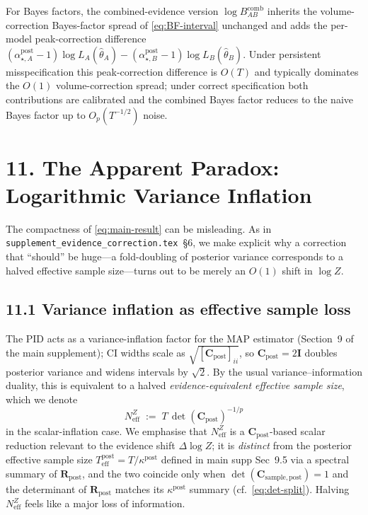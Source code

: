 \documentclass[11pt]{article}
\begin{document}
For Bayes factors, the combined-evidence version $\log B_{AB}^{\mathrm{comb}}$ inherits
the volume-correction Bayes-factor spread of \eqref{eq:BF-interval} unchanged and adds
the per-model peak-correction difference
$(\alpha_{\star,A}^{\mathrm{post}}-1)\log L_A(\hat\theta_A) -
 (\alpha_{\star,B}^{\mathrm{post}}-1)\log L_B(\hat\theta_B)$.
Under persistent misspecification this peak-correction difference is $O(T)$ and
typically dominates the $O(1)$ volume-correction spread; under
correct specification both contributions are calibrated and the combined Bayes
factor reduces to the naive Bayes factor up to $O_p(T^{-1/2})$ noise.

\section*{11. The Apparent Paradox: Logarithmic Variance Inflation}

The compactness of \eqref{eq:main-result} can be misleading. As in
\texttt{supplement\_evidence\_correction.tex}~\S6, we make explicit why a correction that
``should'' be huge---a fold-doubling of posterior variance corresponds to a halved effective
sample size---turns out to be merely an $O(1)$ shift in $\log Z$.

\subsection*{11.1 Variance inflation as effective sample loss}

The PID acts as a variance-inflation factor for the MAP estimator (Section~9 of the main
supplement); CI widths scale as $\sqrt{[\mathbf C_{\mathrm{post}}]_{ii}}$, so
$\mathbf C_{\mathrm{post}} = 2\mathbf I$ doubles posterior variance and widens intervals
by $\sqrt{2}$. By the usual variance--information duality, this is equivalent to a halved
\emph{evidence-equivalent effective sample size}, which we denote
\begin{equation}
N_{\mathrm{eff}}^{Z}
\;:=\;
T\,\det(\mathbf C_{\mathrm{post}})^{-1/p}
\label{eq:Neff-from-Cpost}
\end{equation}
in the scalar-inflation case. We emphasise that $N_{\mathrm{eff}}^{Z}$ is a
$\mathbf C_{\mathrm{post}}$-based scalar reduction relevant to the evidence shift
$\Delta\log Z$; it is \emph{distinct} from the posterior effective sample size
$T_{\mathrm{eff}}^{\mathrm{post}} = T/\kappa^{\mathrm{post}}$ defined in main supp
Sec~9.5 via a spectral summary of $\mathbf R_{\mathrm{post}}$, and the two coincide only
when $\det(\mathbf C_{\mathrm{sample},\mathrm{post}}) = 1$ and the determinant of
$\mathbf R_{\mathrm{post}}$ matches its $\kappa^{\mathrm{post}}$ summary (cf.\
\eqref{eq:det-split}). Halving $N_{\mathrm{eff}}^{Z}$ feels like a major loss of information.
\end{document}
